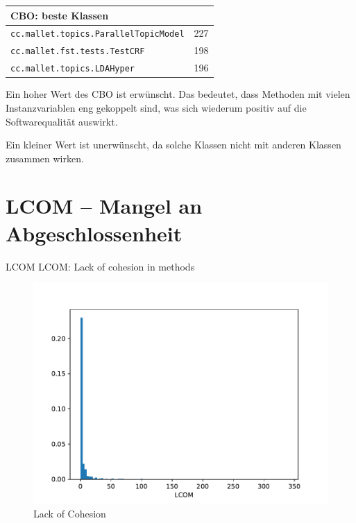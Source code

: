 \documentclass{scrreprt}
\newcommand{\lstx}[1]{\lstinline$#1$}
\begin{document}
\begin{center}
\end{center}


\begin{center}
\begin{tabular}{ll}
\toprule
CBO: beste Klassen\\
\midrule
\lstx{cc.mallet.topics.ParallelTopicModel} & 227 \\
\lstx{cc.mallet.fst.tests.TestCRF} & 198\\
 \lstx{cc.mallet.topics.LDAHyper}&196 \\
\bottomrule
\end{tabular}
\end{center}


Ein hoher Wert des CBO ist erwünscht. Das bedeutet, dass Methoden mit vielen Instanzvariablen eng gekoppelt sind, was sich wiederum positiv auf die Softwarequalität auswirkt.

Ein kleiner Wert ist unerwünscht, da solche Klassen nicht mit anderen Klassen zusammen wirken.

\section{LCOM – Mangel an Abgeschlossenheit}

LCOM
LCOM: Lack of cohesion in methods

\begin{figure}
 \centering
 \includegraphics[width=.8\textwidth]{./LCOM.pdf}
 \caption{Lack of Cohesion}
 \label{abb:lcom}
\end{figure}
\end{document}
